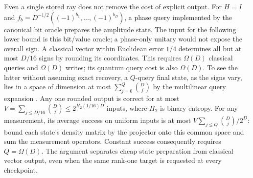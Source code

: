 Even a single stored ray does not remove the cost of explicit output.  For
$H=I$ and $f_b=D^{-1/2}((-1)^{b_1},\ldots,(-1)^{b_D})$, a phase query
implemented by the canonical bit oracle prepares the amplitude state.
The input for the following lower bound is this bit/value oracle; a
phase-only unitary would not expose the overall sign.
A classical vector within Euclidean error
$1/4$ determines all but at most $D/16$ signs by rounding its coordinates.
This requires $\Omega(D)$ classical queries and $\Omega(D)$ writes;
its quantum query cost is also $\Omega(D)$.  To see the latter without
assuming exact recovery, a $Q$-query final state, as the signs vary, lies
in a space of dimension at most $\sum_{j=0}^Q\binom Dj$ by the
multilinear query expansion \citep{BealsEtAl2001}.
Any one rounded output is correct for at most
$V=\sum_{j\leq D/16}\binom Dj\leq2^{H_2(1/16)D}$ inputs, where $H_2$
is binary entropy.
For any measurement, its average success on uniform inputs is at most
$V\sum_{j\leq Q}\binom Dj/2^D$: bound each state's density matrix by
the projector onto this common space and sum the measurement operators.
Constant success consequently requires $Q=\Omega(D)$.
The argument separates cheap state
preparation from classical vector output, even when the same rank-one
target is requested at every checkpoint.
